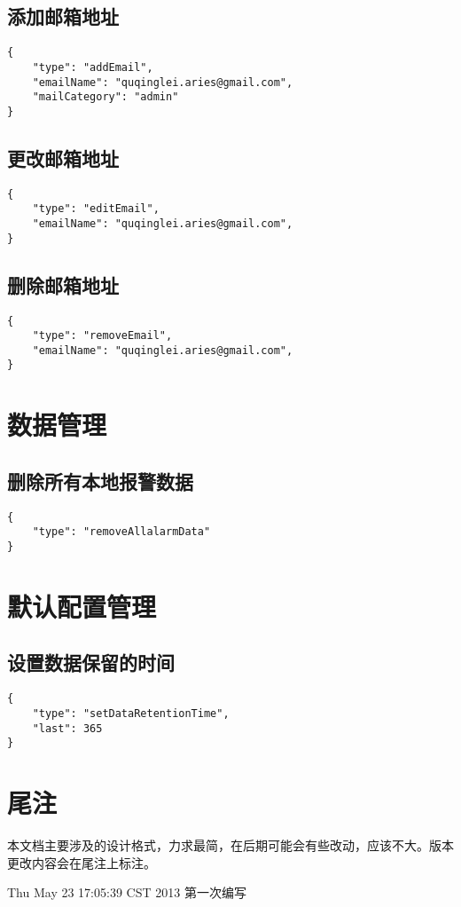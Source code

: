 \documentclass{article}
\begin{document}
\subsection{添加邮箱地址}
\begin{verbatim}
{
    "type": "addEmail",
    "emailName": "quqinglei.aries@gmail.com",
    "mailCategory": "admin"
}
\end{verbatim}

\subsection{更改邮箱地址}
\begin{verbatim}
{
    "type": "editEmail",
    "emailName": "quqinglei.aries@gmail.com",
}
\end{verbatim}

\subsection{删除邮箱地址}
\begin{verbatim}
{
    "type": "removeEmail",
    "emailName": "quqinglei.aries@gmail.com",
}
\end{verbatim}

\section{数据管理}
\subsection{删除所有本地报警数据}
\begin{verbatim}
{
    "type": "removeAllalarmData"
}
\end{verbatim}

\section{默认配置管理}
\subsection{设置数据保留的时间}
\begin{verbatim}
{
    "type": "setDataRetentionTime",
    "last": 365
}
\end{verbatim}

\section{尾注}
本文档主要涉及的设计格式，力求最简，在后期可能会有些改动，应该不大。版本
更改内容会在尾注上标注。

Thu May 23 17:05:39 CST 2013 第一次编写
\end{document}
